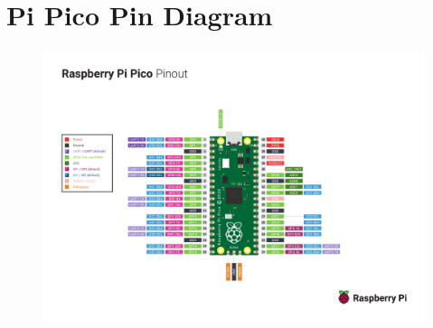 \documentclass[%
 reprint,
 amsmath,amssymb,
 aps,
]{revtex4-2}
\begin{document}
\section{Pi Pico Pin Diagram}

    \begin{figure}[h]
        \includegraphics[width=\columnwidth]{Images/Pico-R3-A4-Pinout.pdf}
    \end{figure}
\end{document}
